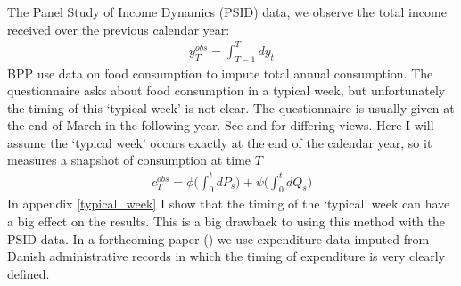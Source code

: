 The Panel Study of Income Dynamics (PSID) data, we observe the total income received over the previous calendar year:
\begin{align*}
y^{obs}_T = \int_{T-1}^{T} dy_t
\end{align*}
BPP use data on food consumption to impute total annual consumption. The questionnaire asks about food consumption in a typical week, but unfortunately the timing of this `typical week' is not clear. The questionnaire is usually given at the end of March in the following year. See \cite{altonji_testing_1987} and \cite{hall_sensitivity_1982} for differing views. Here I will assume the `typical week' occurs exactly at the end of the calendar year, so it measures a snapshot of consumption at time $T$
\begin{align*}
c^{obs}_T = \phi \Big( \int_{0}^{t} dP_s  \Big)  +\psi\Big( \int_{0}^{t}dQ_s\Big)
\end{align*}
In appendix \ref{typical_week} I show that the timing of the `typical' week can have a big effect on the results. This is a big drawback to using this method with the PSID data. In a forthcoming paper (\cite{crawley_consumption_2018}) we use expenditure data imputed from Danish administrative records in which the timing of expenditure is very clearly defined.

